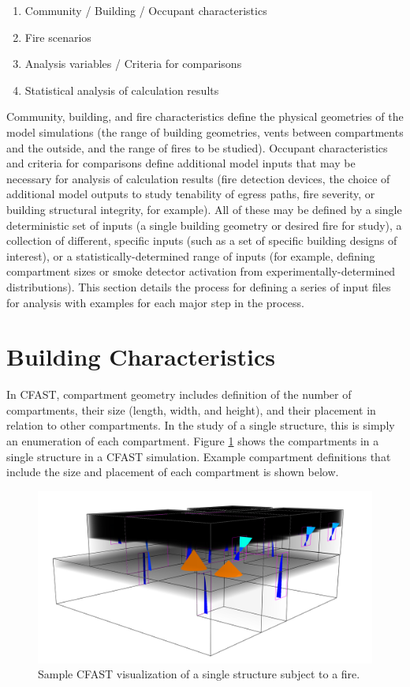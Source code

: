 \documentclass[12pt,twoside]{book}
\begin{document}
\begin{enumerate}
  \item Community / Building / Occupant characteristics
  \item Fire scenarios
  \item Analysis variables / Criteria for comparisons
  \item Statistical analysis of calculation results
\end{enumerate}

Community, building, and fire characteristics define the physical geometries of the model simulations (the range of building geometries, vents between compartments and the outside, and the range of fires to be studied). Occupant characteristics and criteria for comparisons define additional model inputs that may be necessary for analysis of calculation results (fire detection devices, the choice of additional model outputs to study tenability of egress paths, fire severity, or building structural integrity, for example). All of these may be defined by a single deterministic set of inputs (a single building geometry or desired fire for study), a collection of different, specific inputs (such as a set of specific building designs of interest), or a statistically-determined range of inputs (for example, defining compartment sizes or smoke detector activation from experimentally-determined distributions). This section details the process for defining a series of input files for analysis with examples for each major step in the process.

\section{Building Characteristics}

In CFAST, compartment geometry includes definition of the number of compartments, their size (length, width, and height), and their placement in relation to other compartments. In the study of a single structure, this is simply an enumeration of each compartment. Figure \ref{sample_visualization} shows the compartments in a single structure in a CFAST simulation.  Example compartment definitions that include the size and placement of each compartment is shown below.

\begin{figure}[h!]
\includegraphics[width=6.5in]{FIGURES/Sample_Visualization.png}
\caption{Sample CFAST visualization of a single structure subject to a fire.}
\label{sample_visualization}
\end{figure}
\end{document}
